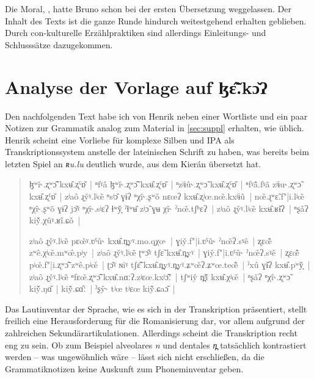 \documentclass[
	12pt,
	ngerman,
]{scrartcl}
\newcommand{\fw}[1]{\textit{#1}} %
\newcommand{\Lhengko}{ɮɛ̃̂.kɔ̌ʔ}
\begin{document}
Die Moral, 
\autocite[77]{jacobs1894}, hatte Bruno schon bei der ersten Übersetzung
weggelassen. Der Inhalt des Texts ist die ganze Runde hindurch weitestgehend
erhalten geblieben. Durch con-kulturelle Erzählpraktiken sind allerdings
Einleitungs- und Schlusssätze dazugekommen.


\section{Analyse der Vorlage auf \Lhengko}
\label{sec:lhenganalys}

Den nachfolgenden Text habe ich von Henrik neben einer Wortliste und ein paar
Notizen zur Grammatik analog zum Material in \cref{sec:suppl} erhalten, wie
üblich. Henrik scheint eine Vorliebe für komplexe Silben und IPA als
Transkriptionssystem anstelle der lateinischen Schrift zu haben, was bereits
beim letzten Spiel an \fw{ʀu.lu} deutlich wurde, aus dem Kierán übersetzt hat.

\begin{quote}
\begin{sloppypar}
	ɮʷǐ˞.ʐʷɔ̃̂ kxʉ̂.ʐˤɒ̌~|
	ⁿfˠâ ɮʷǐ˞.ʐʷɔ̃̂ kxʉ̂.ʐˤɒ̌~|
	ⁿzʲɨû˞.ʐʷɔ̃ kxʉ̂.ʐˤɒ̌~|
	ⁿfˠã̂.fˠã zʲɨu˞.ʐʷɔ̃ kxʉ̂.ʐˤɒ̌~|
	zʲaô ɻy̌ˠ.lʲœ̃ ⁿsʲɔ̌ ɣɨʔ ⁿχî˞.ʂʷǒ nɛœʔ kxʉ̂.ʐʲœ.nœ̌.kxʲɨũ~|
	nœ̌.ɻʷɛ̃.f"|i.lʲœ̃ ⁿχî˞.ʂʷǒ ɣɨʔ jɔ̌ˠ ⁿχî˞.sʲɛʔ ɬʷy̟̌ ˀɬʷʉ̌ zʲɔ̃ ɣʉ χî˞ ˀnœ̌.tʃʰɛʔ~|
	zʲaô ɻy̌ˠ.lʲœ̃ kxʉ̂.ʁɨ̌ʔ~|
	ⁿʂǎʔ kiỹ̌.χûˠ.ʁĩ.ɕǒ~|
	
	zʲaô ɻy̌ˠ.lʲœ̃ pɛœ̌ˠ.ʋˤû˞ kxʉ̂.n̪yˠ.mo.qχo˞~|
	ɣiy̌.f"|i.ʋˤû˞ ˀnœ̌ʔ.sˠê~|
	ʐɛœ̃̂ zʷê.χʲœ̌.mʷœ̂.pʲy~|
	zʲaô ɻy̌ˠ.lʲœ̃ ʈʷɔ̂ˠ tʃɛ̃ kxʉ̂.n̪yˠ~|
	ɣiy̌.f"|i.ʋˤû˞ ˀnœ̌ʔ.sˠê~|
	ʐɛœ̃̂ pʲœ̌.f"|i.ʐʷɔ̃̂ zʷê.pʲœ̌~|
	ʈɔ̌ˠ ɴiˠ tʃɛ̃̂ kxʉ̂.n̪yˠ.n̪yˠ.ʑʷœ̌ʔ.ʑʷœ.teœ̃̂~|
	ˀxû ɣɨ̌ʔ kxʉ̂.pʷy̟̌~|
	zʲaô ɻy̌ˠ.lʲœ̃ ⁿfɛœ̌.ʐʷɔ̃̂ kxʉ̂.nɑːʔ.zʲɛœ.kxʲɔ̃̂ː~|
	tʃʷiŷ n̪ʲĩ̌ kxʉ̂.χʲœ̌~|
	ⁿʂǎʔ ⁿχî˞.ʐʷɔ̃ kiỹ̌.ŋɑ̌~|
	kiỹ̌.ɕɑ̂ː~|
	ˀʂŷ˞ tʲœ tʲɛœ kiỹ̌.ɕaɔ̌~|
\end{sloppypar}
\end{quote}

Das Lautinventar der Sprache, wie es sich in der Transkription präsentiert,
stellt freilich eine Herausforderung für die Romanisierung dar, vor allem
aufgrund der zahlreichen Sekundärartikulationen. Allerdings scheint die
Transkription recht eng zu sein. Ob zum Beispiel alveolares \emph{n} und
dentales \emph{n̪} tatsächlich kontrastiert werden -- was ungewöhnlich wäre --
lässt sich nicht erschließen, da die Grammatiknotizen keine Auskunft zum
Phoneminventar geben.
\end{document}
